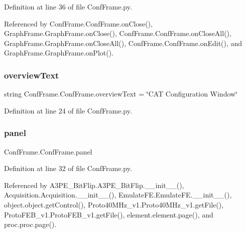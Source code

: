 Definition at line 36 of file Conf\+Frame.\+py.



Referenced by Conf\+Frame.\+Conf\+Frame.\+on\+Close(), Graph\+Frame.\+Graph\+Frame.\+on\+Close(), Conf\+Frame.\+Conf\+Frame.\+on\+Close\+All(), Graph\+Frame.\+Graph\+Frame.\+on\+Close\+All(), Conf\+Frame.\+Conf\+Frame.\+on\+Edit(), and Graph\+Frame.\+Graph\+Frame.\+on\+Plot().

\mbox{\label{classConfFrame_1_1ConfFrame_a65a5a2c5440955179d5b471875f1046d}} 
\subsubsection{\texorpdfstring{overview\+Text}{overviewText}}
{\footnotesize\ttfamily string Conf\+Frame.\+Conf\+Frame.\+overview\+Text = \char`\"{}C\+AT Configuration Window\char`\"{}\hspace{0.3cm}{\ttfamily [static]}}



Definition at line 24 of file Conf\+Frame.\+py.

\mbox{\label{classConfFrame_1_1ConfFrame_aaca068730fdc7eb3f4ba7847bbb82329}} 
\subsubsection{\texorpdfstring{panel}{panel}}
{\footnotesize\ttfamily Conf\+Frame.\+Conf\+Frame.\+panel}



Definition at line 32 of file Conf\+Frame.\+py.



Referenced by A3\+P\+E\+\_\+\+Bit\+Flip.\+A3\+P\+E\+\_\+\+Bit\+Flip.\+\_\+\+\_\+init\+\_\+\+\_\+(), Acquisition.\+Acquisition.\+\_\+\+\_\+init\+\_\+\+\_\+(), Emulate\+F\+E.\+Emulate\+F\+E.\+\_\+\+\_\+init\+\_\+\+\_\+(), object.\+object.\+get\+Control(), Proto40\+M\+Hz\+\_\+v1.\+Proto40\+M\+Hz\+\_\+v1.\+get\+File(), Proto\+F\+E\+B\+\_\+v1.\+Proto\+F\+E\+B\+\_\+v1.\+get\+File(), element.\+element.\+page(), and proc.\+proc.\+page().

